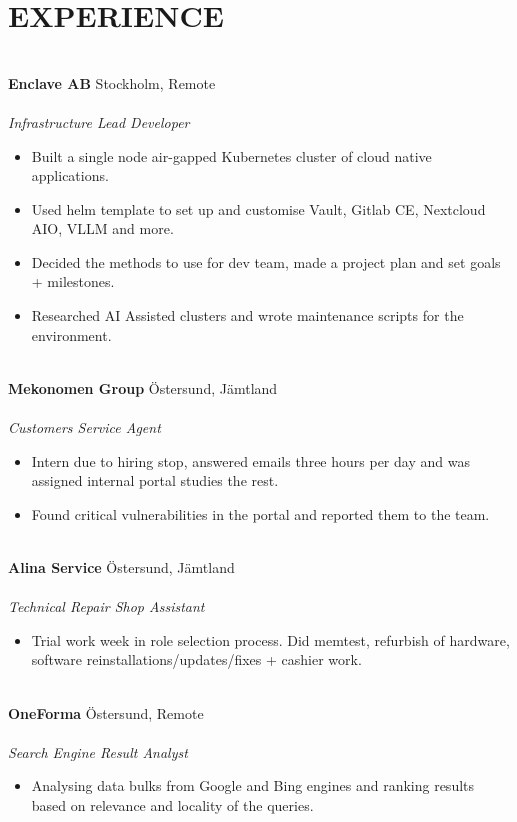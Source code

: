 \documentclass[10pt, a4paper]{article}
\begin{document}
\section*{EXPERIENCE}
\texttt{}\\[-0.5cm]
\textbf{Enclave AB} \hfill Stockholm, Remote\\
\noindent{}\\
\textit{Infrastructure Lead Developer}\\
\begin{itemize}[leftmargin=0.3cm, itemsep=0.1cm]
\item Built a single node air-gapped Kubernetes cluster of cloud native applications.
\item Used helm template to set up and customise Vault, Gitlab CE, Nextcloud AIO, VLLM and more.
\item Decided the methods to use for dev team, made a project plan and set goals + milestones.
\item Researched AI Assisted clusters and wrote maintenance scripts for the environment.
\end{itemize}
\texttt{}\\[-0.2cm]
\textbf{Mekonomen Group} \hfill Östersund, Jämtland\\
\noindent{}\\
\textit{Customers Service Agent}\\
\begin{itemize}[leftmargin=0.3cm, itemsep=0.1cm]
\item Intern due to hiring stop, answered emails three hours per day and was assigned internal portal studies the rest.
\item Found critical vulnerabilities in the portal and reported them to the team. 
\end{itemize}
\texttt{}\\[-0.2cm]
\textbf{Alina Service} \hfill Östersund, Jämtland\\
\noindent{}\\
\textit{Technical Repair Shop Assistant}\\
\begin{itemize}[leftmargin=0.3cm, itemsep=0.1cm]
\item Trial work week in role selection process. Did memtest, refurbish of hardware, software reinstallations/updates/fixes + cashier work.
\end{itemize}
\texttt{}\\[-0.2cm]
\textbf{OneForma} \hfill Östersund, Remote\\
\noindent{}\\
\textit{Search Engine Result Analyst}\\
\begin{itemize}[leftmargin=0.3cm, itemsep=0.1cm]
\item Analysing data bulks from Google and Bing engines and ranking results based on relevance and locality of the queries. 
\end{itemize}
\texttt{}\\[-0.5cm]
\end{document}
